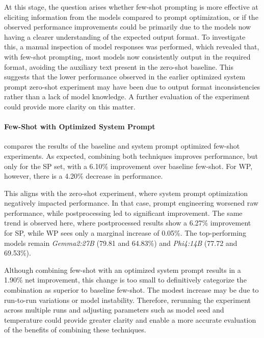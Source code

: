 At this stage, the question arises whether few-shot prompting is more effective at eliciting information from the models compared to prompt optimization, or if the observed performance improvements could be primarily due to the models now having a clearer understanding of the expected output format. To investigate this, a manual inspection of model responses was performed, which revealed that, with few-shot prompting, most models now consistently output in the required format, avoiding the auxiliary text present in the zero-shot baseline. This suggests that the lower performance observed in the earlier optimized system prompt zero-shot experiment may have been due to output format inconsistencies rather than a lack of model knowledge. A further evaluation of the  experiment could provide more clarity on this matter.

\paragraph{Few-Shot with Optimized System Prompt}

 compares the results of the baseline and system prompt optimized few-shot experiments. As expected, combining both techniques improves performance, but only for the \ac{SP} set, with a 6.10\% improvement over baseline few-shot. For \ac{WP}, however, there is a 4.20\% decrease in performance.

This aligns with the zero-shot experiment, where system prompt optimization negatively impacted performance. In that case, prompt engineering worsened raw performance, while postprocessing led to significant improvement. The same trend is observed here, where postprocessed results show a 6.27\% improvement for \ac{SP}, while \ac{WP} sees only a marginal increase of 0.05\%. The top-performing models remain \textit{Gemma2:27B} (79.81 and 64.83\%) and \textit{Phi4:14B} (77.72 and 69.53\%).

Although combining few-shot with an optimized system prompt results in a 1.90\% net improvement, this change is too small to definitively categorize the combination as superior to baseline few-shot. The modest increase may be due to run-to-run variations or model instability. Therefore, rerunning the experiment across multiple runs and adjusting parameters such as model seed and temperature could provide greater clarity and enable a more accurate evaluation of the benefits of combining these techniques.

